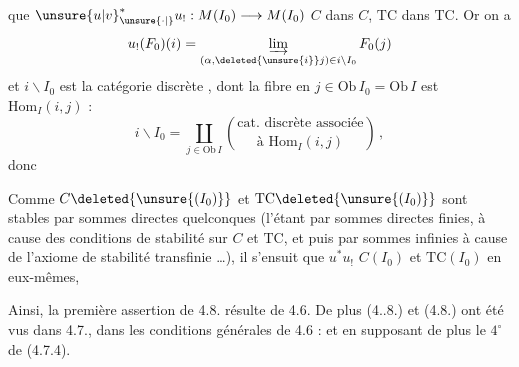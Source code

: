 
que $\unsure{u|v}_{\unsure{\cdot|{}}}^*u_!:M(I_0)\longrightarrow M(I_0)$   $C$ dans $C$, $\mathrm{TC}$ dans $\mathrm{TC}$. Or on a
\[
u_!(F_0)(i)=\varinjlim_{(\alpha,\deleted{\unsure{i}}j)\in i\backslash I_0}F_0(j)
\]
 et $i\backslash I_0$ est la catégorie discrète , dont la fibre en $j\in\mathrm{Ob}\,I_0=\mathrm{Ob}\,I$ est $\mathrm{Hom}_I(i,j)$ :
\[
i\backslash I_0=\coprod_{j\in\mathrm{Ob}\,I}\binom{\text{cat. discrète associée}}{\text{à }\mathrm{Hom}_I(i,j)}\,,
\]
donc

Comme $C\deleted{\unsure{(I_0)}}$ et $\mathrm{TC}\deleted{\unsure{(I_0)}}$ sont stables par sommes directes quelconques (l'étant par sommes directes finies, à cause des conditions de stabilité  sur $C$ et $\mathrm{TC}$, et puis par sommes infinies à cause de l'axiome 
de stabilité transfinie \ldots), il s'ensuit  que $u^*u_!$   $C(I_0)$ et $\mathrm{TC}(I_0)$ en eux-mêmes,

Ainsi, la  première assertion de 4.8. résulte de 4.6. De plus (4..8.) et (4.8.) ont été vus dans 4.7., dans les conditions générales de 4.6 : et en supposant de plus le $4^\circ$ de (4.7.4)\unsure{)|{}}.

